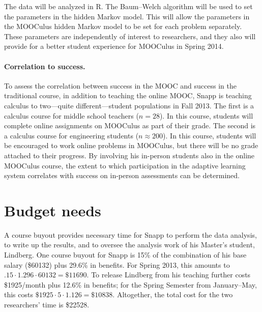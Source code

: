 \documentclass[12pt]{article}
\begin{document}
The data will be analyzed in R.  The Baum--Welch algorithm will be used
to set the parameters in the hidden Markov model. This will allow the
parameters in the MOOCulus hidden Markov model to be set for each
problem separately.  These parameters are independently of interest to
researchers, and they also will provide for a better student
experience for MOOCulus in Spring 2014.

\paragraph{Correlation to success.}

To assess the correlation between success in the MOOC and success in
the traditional course, in addition to teaching the online MOOC, Snapp
is teaching calculus to two---quite different---student populations in
Fall 2013.  The first is a calculus course for middle school teachers
($n=28$). In this course, students will complete online assignments on
MOOCulus as part of their grade.  The second is a calculus course for
engineering students ($n\approx 200$).  In this course, students will
be encouraged to work online problems in MOOCulus, but there will be
no grade attached to their progress.  By involving his in-person
students also in the online MOOCulus course, the extent to which
participation in the adaptive learning system correlates with success
on in-person assessments can be determined.

\section{Budget needs}
A course buyout provides necessary time for Snapp to perform the data
analysis, to write up the results, and to oversee the analysis work of
his Master's student, Lindberg.  One course buyout for Snapp is 15\%
of the combination of his base salary (\$60132) plus 29.6\% in
benefits. For Spring 2013, this amounts to $.15 \cdot 1.296\cdot
60132=\$11690$.  To release Lindberg from his teaching further costs
\$1925/month plus 12.6\% in benefits; for the Spring Semester from
January--May, this costs $\$1925 \cdot 5 \cdot 1.126 = \$10838$.
Altogether, the total cost for the two researchers' time is \$22528.


\pagebreak
\printbibliography
\end{document}
